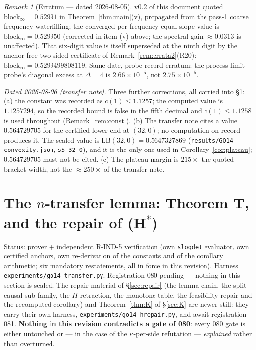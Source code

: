 \documentclass[11pt]{article}
\theoremstyle{definition}
\theoremstyle{remark}
\newtheorem{remark}{Remark}
\begin{document}
\begin{remark}[Erratum --- dated 2026-08-05]
\label{rem:erratum}
v0.2 of this document quoted $\mathrm{block}_\infty=0.52991$ in
Theorem~\ref{thm:main}(v), propagated from the pass-1 coarse
frequency waterfilling; the converged per-frequency equal-slope
value is $\mathrm{block}_\infty=0.529950$ (corrected in item (v)
above; the spectral gain $\approx0.0313$ is unaffected). That
six-digit value is itself superseded at the ninth digit by the
anchor-free two-sided certificate of Remark~\ref{rem:errata2}(R20):
$\mathrm{block}_\infty=0.5299499808119$. Same date,
probe-record erratum: the process-limit probe's diagonal excess at
$\Delta=4$ is $2.66\times10^{-5}$, not $2.75\times10^{-5}$.

\emph{Dated 2026-08-06 (transfer note).} Three further corrections,
all carried into \S\ref{sec:transfer}: (a) the constant was recorded
as $c(1)\le1.1257$; the computed value is $1.1257294$, so the
recorded bound is false in the fifth decimal and $c(1)\le1.1258$ is
used throughout (Remark~\ref{rem:const}). (b) The transfer note cites
a value $0.564729705$ for the certified lower end at $(32,0)$; no
computation on record produces it. The sealed value is
$\mathrm{LB}(32,0)=0.5647327869$
(\texttt{results/GO14-convexity.json}, \texttt{s5\_32\_0}), and it is
the only one used in Corollary~\ref{cor:plateau}; $0.564729705$ must
not be cited. (c) The plateau margin is $215\times$ the quoted
bracket width, not the $\approx250\times$ of the transfer note.
\end{remark}

\section{The $n$-transfer lemma: Theorem T, and the repair of
(H$^\ast$)}
\label{sec:transfer}
Status: prover + independent R-IND-5 verification (own \texttt{slogdet}
evaluator, own certified anchors, own re-derivation of the constants
and of the corollary arithmetic; six mandatory restatements, all in
force in this revision). Harness
\texttt{experiments/\allowbreak go14\_transfer.py}. Registration 080
pending --- nothing in this section is sealed. The repair material of
\S\ref{sec:repair} (the lemma chain, the split-causal sub-family, the
$\Pi$-retraction, the monotone table, the feasibility repair and the
recomputed corollary) and Theorem~\ref{thm:K} of \S\ref{sec:K} are
newer still: they carry their own harness,
\texttt{experiments/\allowbreak go14\_hrepair.py}, and await
registration 081. \textbf{Nothing in this revision contradicts a gate
of 080}: every 080 gate is either untouched or --- in the case of the
$\kappa$-per-side refutation --- \emph{explained} rather than
overturned.
\end{document}
